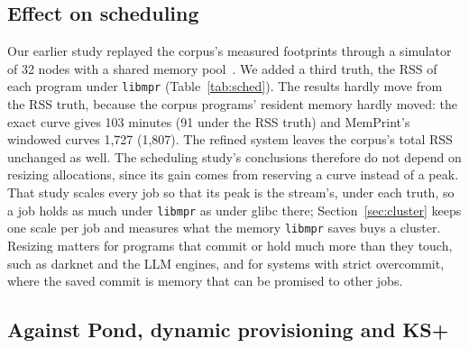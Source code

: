 \documentclass[11pt]{article}
\newcommand{\libmpr}{\texttt{libmpr}}
\newcommand{\secref}[1]{Section~\ref{#1}}
\newcommand{\tabref}[1]{Table~\ref{#1}}
\begin{document}
\subsection{Effect on scheduling}
\label{sec:schedeffect}

\begin{table}[t]
\centering\small

\caption{Mean response time (minutes) at 80\% offered load in the DMSched-Sim scheduler of our earlier
study~\cite{memprintsched}, with calibrated margins, under three truths of what a job holds. The third truth is
each program's RSS when it runs with \libmpr{} (first version) and its own profile.}
\label{tab:sched}
\end{table}

Our earlier study replayed the corpus's measured footprints through a simulator of 32 nodes with a shared
memory pool~\cite{memprintsched}. We added a third truth, the RSS of each program under \libmpr{}
(\tabref{tab:sched}). The results hardly move from the RSS truth, because the corpus programs' resident memory
hardly moved: the exact curve gives 103 minutes (91 under the RSS truth) and MemPrint's windowed curves 1{,}727
(1{,}807). The refined system leaves the corpus's total RSS unchanged as well. The scheduling study's conclusions
therefore do not depend on resizing allocations, since its gain comes from reserving a curve instead of a peak.
That study scales every job so that its peak is the stream's, under each truth, so a job holds as much under
\libmpr{} as under glibc there; \secref{sec:cluster} keeps one scale per job and measures what the memory
\libmpr{} saves buys a cluster.
Resizing matters for programs that commit or hold much more than they touch, such as darknet and the LLM engines,
and for systems with strict overcommit, where the saved commit is memory that can be promised to other jobs.


\subsection{Against Pond, dynamic provisioning and KS+}
\label{sec:baselines}

\begin{table}[t]
\centering\small

\caption{Memory each approach holds for the 29 workloads (the 23 corpus programs at their largest inputs, miniVite
built with the pass, six LLM configurations), summed over the workloads: the peak and the time-averaged memory
held over the run, in MB, mean of three runs. The demand a job must be given is its RSS (default overcommit, a
cgroup limit) or the larger of its commit and its RSS (strict overcommit). Every approach starts from the same exact
request, the job's peak of commit and RSS under glibc. Pond holds the whole request; the row below it is the part
in local DRAM. Failures count KS+'s re-executions over all workloads and runs.}
\label{tab:baselines}
\end{table}
\end{document}
